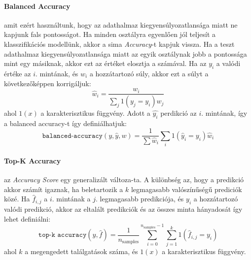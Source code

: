 \documentclass[acmtog, authorversion]{acmart}
\begin{document}
\paragraph{Balanced Accuracy}
amit ezért használtunk, hogy az adathalmaz kiegyensúlyozatlansága miatt ne kapjunk fals pontosságot. Ha minden osztályra egyenlően jól teljesít a klasszifikációs modellünk, akkor a sima \emph{Accuracy}-t kapjuk vissza.
Ha a teszt adathalmaz kiegyensúlyozatlansága miatt az egyik osztálynak jobb a pontossága mint egy másiknak, akkor ezt az értéket
elosztja a számával. Ha az \begin{math}y_i\end{math} a valódi értéke az \begin{math}i\end{math}. mintának, és
\begin{math}w_i\end{math} a hozzátartozó súly, akkor ezt a súlyt a következőképpen korrigáljuk:
\begin{equation}
    \hat{w}_i = \frac{w_i}{\sum_j{1(y_j = y_i) w_j}}
\end{equation}
ahol \begin{math}1(x)\end{math} a karakterisztikus függvény. Adott a \begin{math}\hat{y_i}\end{math} perdikció az \begin{math}i\end{math}.
mintának, így a balanced accuracy-t így definiálhatjuk:
\begin{equation}
    \texttt{balanced-accuracy}(y, \hat{y}, w) = \frac{1}{\sum{\hat{w}_i}} \sum_i 1(\hat{y}_i = y_i) \hat{w}_i
\end{equation}
\paragraph{Top-K Accuracy}
az \emph{Accuracy Score} egy generalizált változa-ta. A különbség az, hogy a predikció akkor számít igaznak, ha beletartozik a \begin{math}k\end{math}
legmagasabb valószínűségű prediciók közé. Ha \begin{math}\hat{f}_{i,j}\end{math} a \begin{math}i\end{math}. mintának a \begin{math}j\end{math}. legmagasabb 
predikciója, és \begin{math}y_i\end{math} a hozzátartozó valódi predikció, akkor az eltalált predikciók és az összes minta hányadosát így
lehet definiálni:
\begin{equation}
    \texttt{top-k accuracy}(y, \hat{f}) = \frac{1}{n_\text{samples}} \sum_{i=0}^{n_\text{samples}-1} \sum_{j=1}^{k} 1(\hat{f}_{i,j} = y_i)
\end{equation}
ahol \begin{math}k\end{math} a megengedett találgatások száma, és \begin{math}1(x)\end{math} a karakterisztikus függvény.
\end{document}
